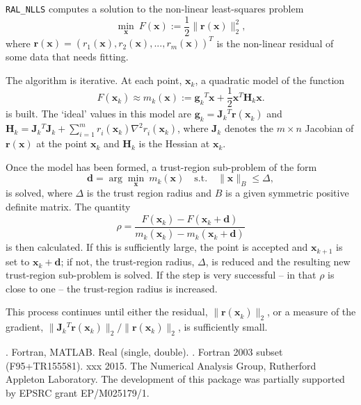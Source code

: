 \documentclass{hslspec}
\newcommand{\libraryname}{RAL}
\newcommand{\packagename}{NLLS}
\newcommand{\fullpackagename}{\libraryname\_\packagename}
\newcommand{\versionum}{1.0.0}
\newcommand{\versiondate}{xx xx 20xx}
\newcommand{\vx}{ {\bm x} } %
\newcommand{\vr}{ {\bm r} } %
\newcommand{\vg}{ {\bm g} } %
\newcommand{\vd}{ {\bm d} } %
\newcommand{\vH}{ {\bm H} } %
\newcommand{\vJ}{ {\bm J} } %
\newcommand{\iter}[2][k]{ #2_{#1}^{}} %
\newcommand{\comp}[2][i]{ #2_{#1}^{}} %
\begin{document}
\hslheader

\hslsummary
{\tt \fullpackagename} computes a solution to the non-linear least-squares problem
\begin{equation}
\min_\vx \  F(\vx) := \frac{1}{2}\| \vr(\vx) \|_2^2,
\label{eq:nlls_problem}
\end{equation}
where $\vr(\vx) =(\comp[1]{r}(\vx), \comp[2]{r}(\vx),...,\comp[m]{r}(\vx))^T$ is the non-linear residual of 
some data that needs fitting.

The algorithm is iterative.
At each point, $\iter{\vx}$, a quadratic model of the function
\[
F(\iter{\vx}) \approx \iter{m}(\vx) := \iter{\vg}^T \vx + \frac{1}{2} \vx^T \iter{\vH} \vx.
\]
is built.
The `ideal' values in this model are $\iter{\vg} = \iter{\vJ}^T\vr(\iter{\vx})$ and 
$\iter{\vH} = \iter{\vJ}^T\iter{\vJ} + \sum_{i = 1}^m \comp{r}(\iter{\vx}) \nabla^2 \comp{r}(\iter{\vx})$, 
where $\iter{\vJ}$ denotes the $m \times n$ Jacobian of $\vr(\vx)$ at the point $\iter{\vx}$
and $\iter{\vH}$ is the Hessian at $\iter{\vx}$.

Once the model has been formed, a trust-region sub-problem of the form
\[
\vd = \arg \min_{\vx} \ \iter{m} (\vx) \quad \mathrm{s.t.} \quad  \|\vx\|_B \leq \Delta,
\]
is solved, 
where $\Delta$ is the trust region radius and $B$ is a given symmetric positive definite matrix. 
The quantity
\[\rho = \frac{F(\iter{\vx}) - F(\iter{\vx} + \vd)}{\iter{m}(\iter{\vx}) - \iter{m}(\iter{\vx} + \vd)}\]
is then calculated.
If this is sufficiently large, the point is accepted and  $\iter[k+1]{\vx}$ is set to $\iter{\vx} + \vd$; if not, the trust-region radius, $\Delta$, 
is reduced and  the resulting new trust-region sub-problem is solved.  If the step is very successful -- in that $\rho$ is close to one -- 
the trust-region radius is increased.

This process continues until either the residual, $\|\vr(\iter{\vx})\|_2$, or a measure of the gradient,
$\|\iter{\vJ}^T\vr(\iter{\vx})\|_2 / \|\vr(\iter{\vx})\|_2$, is sufficiently small.


\hslattributes
\hslversions{\versionum\ ({\color{red}\versiondate)}}.
\hslinterfaces Fortran, MATLAB.
\hslIRDCZ Real (single, double).
.
\hsllanguage Fortran 2003 subset (F95+TR155581).  
\hsldate xxx 2015. 
\hslorigin The Numerical Analysis Group, Rutherford Appleton Laboratory.
\hslremark The development of this package was 
partially supported by EPSRC grant EP/M025179/1.
\end{document}
